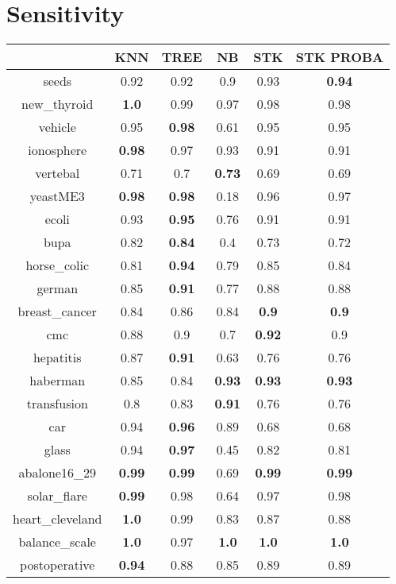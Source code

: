 \documentclass{article}%
\begin{document}
\section*{Sensitivity}%
\begin{tabular}{c|ccccc}%
&KNN&TREE&NB&STK&STK PROBA\\%
\hline%
seeds&0.92&0.92&0.9&0.93&\textbf{0.94}\\%
new\_thyroid&\textbf{1.0}&0.99&0.97&0.98&0.98\\%
vehicle&0.95&\textbf{0.98}&0.61&0.95&0.95\\%
ionosphere&\textbf{0.98}&0.97&0.93&0.91&0.91\\%
vertebal&0.71&0.7&\textbf{0.73}&0.69&0.69\\%
yeastME3&\textbf{0.98}&\textbf{0.98}&0.18&0.96&0.97\\%
ecoli&0.93&\textbf{0.95}&0.76&0.91&0.91\\%
bupa&0.82&\textbf{0.84}&0.4&0.73&0.72\\%
horse\_colic&0.81&\textbf{0.94}&0.79&0.85&0.84\\%
german&0.85&\textbf{0.91}&0.77&0.88&0.88\\%
breast\_cancer&0.84&0.86&0.84&\textbf{0.9}&\textbf{0.9}\\%
cmc&0.88&0.9&0.7&\textbf{0.92}&0.9\\%
hepatitis&0.87&\textbf{0.91}&0.63&0.76&0.76\\%
haberman&0.85&0.84&\textbf{0.93}&\textbf{0.93}&\textbf{0.93}\\%
transfusion&0.8&0.83&\textbf{0.91}&0.76&0.76\\%
car&0.94&\textbf{0.96}&0.89&0.68&0.68\\%
glass&0.94&\textbf{0.97}&0.45&0.82&0.81\\%
abalone16\_29&\textbf{0.99}&\textbf{0.99}&0.69&\textbf{0.99}&\textbf{0.99}\\%
solar\_flare&\textbf{0.99}&0.98&0.64&0.97&0.98\\%
heart\_cleveland&\textbf{1.0}&0.99&0.83&0.87&0.88\\%
balance\_scale&\textbf{1.0}&0.97&\textbf{1.0}&\textbf{1.0}&\textbf{1.0}\\%
postoperative&\textbf{0.94}&0.88&0.85&0.89&0.89\\%
\end{tabular}

%
\end{document}
